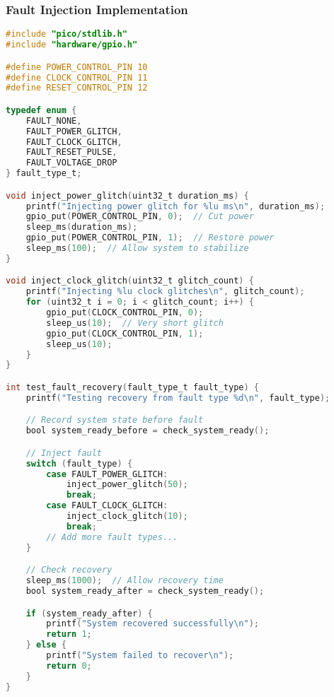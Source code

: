 \documentclass{beamer}
\begin{document}
\begin{frame}[fragile]
\frametitle{Fault Injection Implementation}
\begin{lstlisting}[language=C]
#include "pico/stdlib.h"
#include "hardware/gpio.h"

#define POWER_CONTROL_PIN 10
#define CLOCK_CONTROL_PIN 11
#define RESET_CONTROL_PIN 12

typedef enum {
    FAULT_NONE,
    FAULT_POWER_GLITCH,
    FAULT_CLOCK_GLITCH,
    FAULT_RESET_PULSE,
    FAULT_VOLTAGE_DROP
} fault_type_t;

void inject_power_glitch(uint32_t duration_ms) {
    printf("Injecting power glitch for %lu ms\n", duration_ms);
    gpio_put(POWER_CONTROL_PIN, 0);  // Cut power
    sleep_ms(duration_ms);
    gpio_put(POWER_CONTROL_PIN, 1);  // Restore power
    sleep_ms(100);  // Allow system to stabilize
}

void inject_clock_glitch(uint32_t glitch_count) {
    printf("Injecting %lu clock glitches\n", glitch_count);
    for (uint32_t i = 0; i < glitch_count; i++) {
        gpio_put(CLOCK_CONTROL_PIN, 0);
        sleep_us(10);  // Very short glitch
        gpio_put(CLOCK_CONTROL_PIN, 1);
        sleep_us(10);
    }
}

int test_fault_recovery(fault_type_t fault_type) {
    printf("Testing recovery from fault type %d\n", fault_type);

    // Record system state before fault
    bool system_ready_before = check_system_ready();

    // Inject fault
    switch (fault_type) {
        case FAULT_POWER_GLITCH:
            inject_power_glitch(50);
            break;
        case FAULT_CLOCK_GLITCH:
            inject_clock_glitch(10);
            break;
        // Add more fault types...
    }

    // Check recovery
    sleep_ms(1000);  // Allow recovery time
    bool system_ready_after = check_system_ready();

    if (system_ready_after) {
        printf("System recovered successfully\n");
        return 1;
    } else {
        printf("System failed to recover\n");
        return 0;
    }
}
\end{lstlisting}
\end{frame}
\end{document}

